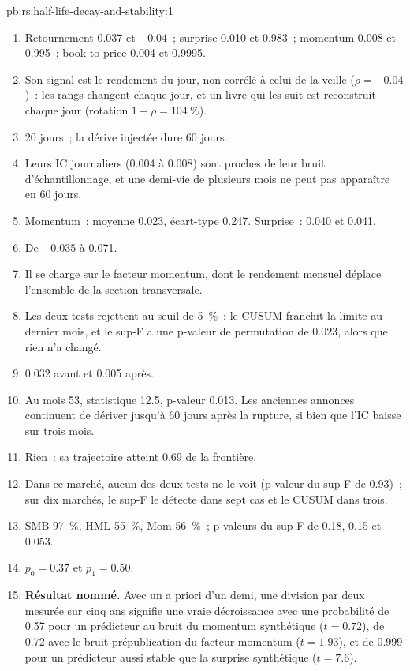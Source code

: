 \begin{solution}{pb:rs:half-life-decay-and-stability:1}
\begin{enumerate}
\item Retournement 0.037 et $-0.04$~; surprise 0.010 et 0.983~; momentum 0.008 et 0.995~; book-to-price 0.004 et 0.9995.
\item Son signal est le rendement du jour, non corrélé à celui de la veille ($\rho = -0.04$)~: les rangs changent chaque jour, et un livre qui les suit est
reconstruit chaque jour (rotation $1 - \rho = 104~\%$).
\item 20 jours~; la dérive injectée dure 60 jours.
\item Leurs IC journaliers (0.004 à 0.008) sont proches de leur bruit d'échantillonnage, et une demi-vie de plusieurs mois ne peut pas apparaître en 60 jours.
\item Momentum~: moyenne 0.023, écart-type 0.247. Surprise~: 0.040 et 0.041.
\item De $-0.035$ à 0.071.
\item Il se charge sur le facteur momentum, dont le rendement mensuel déplace l'ensemble de la section transversale.
\item Les deux tests rejettent au seuil de 5~\%~: le CUSUM franchit la limite au dernier mois, et le sup-F a une p-valeur de permutation de 0.023, alors que rien n'a changé.
\item 0.032 avant et 0.005 après.
\item Au mois 53, statistique 12.5, p-valeur 0.013. Les anciennes annonces continuent de dériver jusqu'à 60 jours après la rupture, si bien que l'IC baisse sur trois
mois.
\item Rien~: sa trajectoire atteint 0.69 de la frontière.
\item Dans ce marché, aucun des deux tests ne le voit (p-valeur du sup-F de 0.93)~; sur dix marchés, le sup-F le détecte dans sept cas et le CUSUM dans trois.
\item SMB 97~\%, HML 55~\%, Mom 56~\%~; p-valeurs du sup-F de 0.18, 0.15 et 0.053.
\item $p_0 = 0.37$ et $p_1 = 0.50$.
\item \textbf{Résultat nommé.} Avec un a priori d'un demi, une division par deux mesurée sur cinq ans signifie une vraie décroissance avec une probabilité de 0.57 pour un prédicteur
au bruit du momentum synthétique ($t = 0.72$), de 0.72 avec le bruit prépublication du facteur momentum ($t = 1.93$), et de 0.999 pour un prédicteur aussi stable que la
surprise synthétique ($t = 7.6$).

\end{enumerate}
\end{solution}
